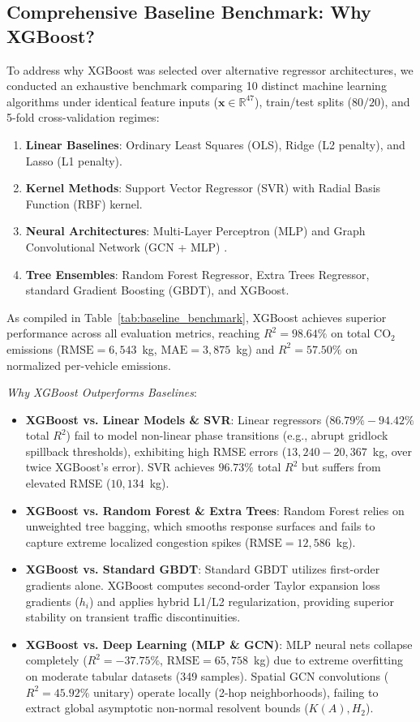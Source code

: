 \documentclass[lettersize,journal]{IEEEtran}
\begin{document}
\subsection{Comprehensive Baseline Benchmark: Why XGBoost?}
To address why XGBoost was selected over alternative regressor architectures, we conducted an exhaustive benchmark comparing 10 distinct machine learning algorithms under identical feature inputs ($\mathbf{x} \in \mathbb{R}^{47}$), train/test splits ($80/20$), and 5-fold cross-validation regimes:
\begin{enumerate}
    \item \textbf{Linear Baselines}: Ordinary Least Squares (OLS), Ridge (L2 penalty), and Lasso (L1 penalty).
    \item \textbf{Kernel Methods}: Support Vector Regressor (SVR) with Radial Basis Function (RBF) kernel.
    \item \textbf{Neural Architectures}: Multi-Layer Perceptron (MLP) and Graph Convolutional Network (GCN + MLP) \cite{Kipf2017}.
    \item \textbf{Tree Ensembles}: Random Forest Regressor, Extra Trees Regressor, standard Gradient Boosting (GBDT), and XGBoost.
\end{enumerate}

As compiled in Table~\ref{tab:baseline_benchmark}, XGBoost achieves superior performance across all evaluation metrics, reaching $R^2 = 98.64\%$ on total $\text{CO}_2$ emissions ($\text{RMSE} = 6,543$~kg, $\text{MAE} = 3,875$~kg) and $R^2 = 57.50\%$ on normalized per-vehicle emissions.

\textit{Why XGBoost Outperforms Baselines}:
\begin{itemize}
    \item \textbf{XGBoost vs. Linear Models \& SVR}: Linear regressors ($86.79\% - 94.42\%$ total $R^2$) fail to model non-linear phase transitions (e.g., abrupt gridlock spillback thresholds), exhibiting high RMSE errors ($13,240 - 20,367$~kg, over twice XGBoost's error). SVR achieves $96.73\%$ total $R^2$ but suffers from elevated RMSE ($10,134$~kg).
    \item \textbf{XGBoost vs. Random Forest \& Extra Trees}: Random Forest relies on unweighted tree bagging, which smooths response surfaces and fails to capture extreme localized congestion spikes ($\text{RMSE} = 12,586$~kg).
    \item \textbf{XGBoost vs. Standard GBDT}: Standard GBDT utilizes first-order gradients alone. XGBoost computes second-order Taylor expansion loss gradients ($h_i$) and applies hybrid L1/L2 regularization, providing superior stability on transient traffic discontinuities.
    \item \textbf{XGBoost vs. Deep Learning (MLP \& GCN)}: MLP neural nets collapse completely ($R^2 = -37.75\%$, $\text{RMSE} = 65,758$~kg) due to extreme overfitting on moderate tabular datasets (349 samples). Spatial GCN convolutions ($R^2 = 45.92\%$ unitary) operate locally (2-hop neighborhoods), failing to extract global asymptotic non-normal resolvent bounds ($K(A), H_2$).
\end{itemize}
\end{document}

